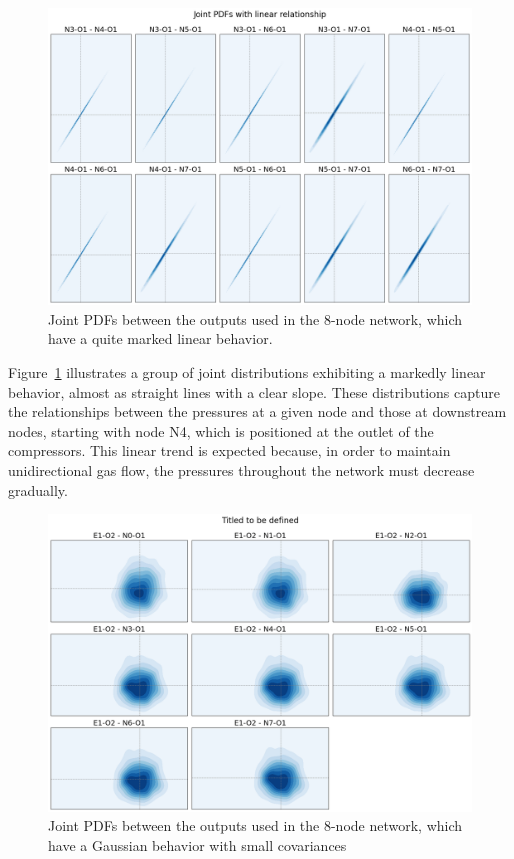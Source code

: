 \begin{figure}
    \begin{center}
        \includegraphics[width=.67\textwidth]{figures/Chapter_NonLinealCensnet/outputs_outputs_linear.png}
    \end{center}
    \caption{Joint PDFs between the outputs used in the 8-node network, which have a quite marked linear behavior.}\label{fig:joint_distributions_output_output_linear}
\end{figure}
 

Figure~\ref{fig:joint_distributions_output_output_linear} illustrates a group of joint distributions exhibiting a markedly linear behavior, almost as straight lines with a clear slope. These distributions capture the relationships between the pressures at a given node and those at downstream nodes, starting with node N4, which is positioned at the outlet of the compressors. This linear trend is expected because, in order to maintain unidirectional gas flow, the pressures throughout the network must decrease gradually. 

\begin{figure}
    \begin{center}
        \includegraphics[width=.67\textwidth]{figures/Chapter_NonLinealCensnet/outputs_outputs_5.png}
    \end{center}
    \caption{Joint PDFs between the outputs used in the 8-node network, which have a Gaussian behavior with small covariances }\label{fig:joint_distributions_output_output_5}
\end{figure}
 

